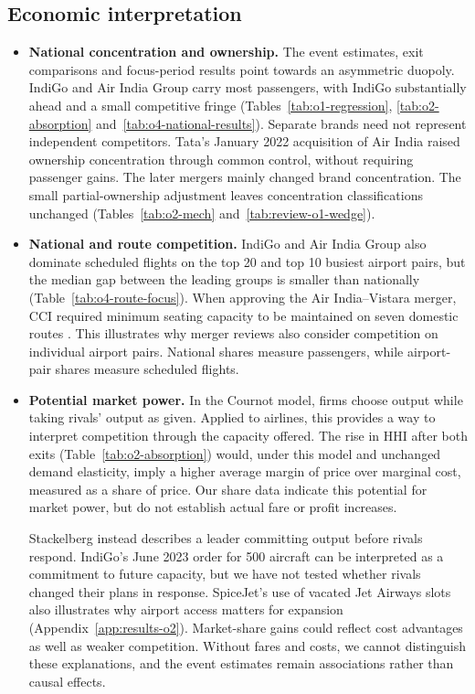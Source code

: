 \subsection{Economic interpretation}
\label{sec:review-economic-interpretation}
\begin{itemize}[itemsep=0pt,parsep=0pt,topsep=4pt]
\item \textbf{National concentration and ownership.} The event estimates, exit comparisons and focus-period results point towards an asymmetric duopoly. IndiGo and Air India Group carry most passengers, with IndiGo substantially ahead and a small competitive fringe (Tables~\ref{tab:o1-regression}, \ref{tab:o2-absorption} and~\ref{tab:o4-national-results}). Separate brands need not represent independent competitors. Tata's January 2022 acquisition of Air India raised ownership concentration through common control, without requiring passenger gains. The later mergers mainly changed brand concentration. The small partial-ownership adjustment leaves concentration classifications unchanged (Tables~\ref{tab:o2-mech} and~\ref{tab:review-o1-wedge}).

\item \textbf{National and route competition.} IndiGo and Air India Group also dominate scheduled flights on the top 20 and top 10 busiest airport pairs, but the median gap between the leading groups is smaller than nationally (Table~\ref{tab:o4-route-focus}). When approving the Air India--Vistara merger, CCI required minimum seating capacity to be maintained on seven domestic routes \parencite{cci2023vistara}. This illustrates why merger reviews also consider competition on individual airport pairs. National shares measure passengers, while airport-pair shares measure scheduled flights.

\item \textbf{Potential market power.} In the Cournot model, firms choose output while taking rivals' output as given. Applied to airlines, this provides a way to interpret competition through the capacity offered. The rise in HHI after both exits (Table~\ref{tab:o2-absorption}) would, under this model and unchanged demand elasticity, imply a higher average margin of price over marginal cost, measured as a share of price. Our share data indicate this potential for market power, but do not establish actual fare or profit increases.

Stackelberg instead describes a leader committing output before rivals respond. IndiGo's June 2023 order for 500 aircraft \parencite{airbus2023indigo} can be interpreted as a commitment to future capacity, but we have not tested whether rivals changed their plans in response. SpiceJet's use of vacated Jet Airways slots also illustrates why airport access matters for expansion (Appendix~\ref{app:results-o2}). Market-share gains could reflect cost advantages as well as weaker competition. Without fares and costs, we cannot distinguish these explanations, and the event estimates remain associations rather than causal effects.


\end{itemize}
